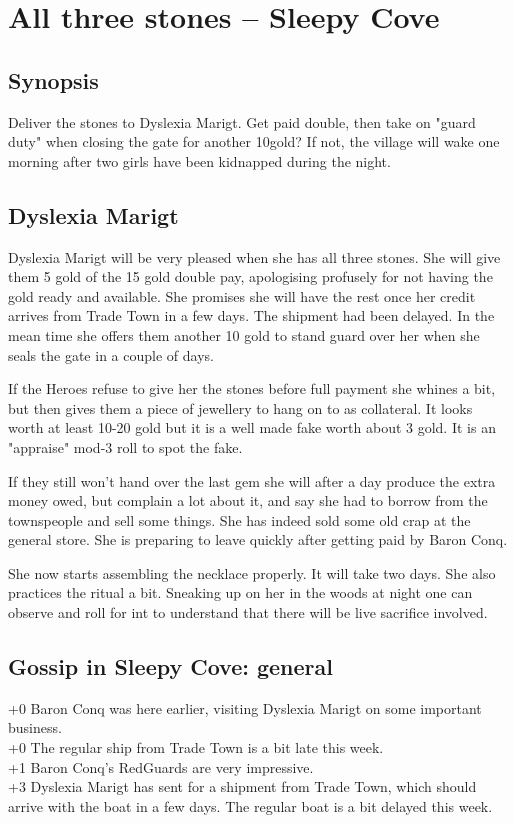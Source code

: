 \clearpage
{}
\section*{All three stones -- Sleepy Cove}


\subsection*{Synopsis}
Deliver the stones to Dyslexia Marigt. Get paid double, then take on "guard duty" when closing the gate for another 10gold? If not, the village will wake one morning after two girls have been kidnapped during the night.


\subsection*{Dyslexia Marigt}
Dyslexia Marigt will be very pleased when she has all three stones. She will give them 5 gold of the 15 gold double pay, apologising profusely for not having the gold ready and available. She promises she will have the rest once her credit arrives from Trade Town in a few days. The shipment had been delayed.
In the mean time she offers them another 10 gold to stand guard over her when she seals the gate in a couple of days.

If the Heroes refuse to give her the stones before full payment she whines a bit, but then gives them a piece of jewellery to hang on to as collateral. It looks worth at least 10-20 gold but it is a well made fake worth about 3 gold. It is an "appraise" mod-3 roll to spot the fake.

If they still won't hand over the last gem she will after a day produce the extra money owed, but complain a lot about it, and say she had to borrow from the townspeople and sell some things. She has indeed sold some old crap at the general store. She is preparing to leave quickly after getting paid by Baron Conq.

She now starts assembling the necklace properly. It will take two days. She also practices the ritual a bit. Sneaking up on her in the woods at night one can observe and roll for int to understand that there will be live sacrifice involved.


\subsection*{Gossip in Sleepy Cove: general}
+0 Baron Conq was here earlier, visiting Dyslexia Marigt on some important  business. \\
+0 The regular ship from Trade Town is a bit late this week. \\
+1 Baron Conq's RedGuards are very impressive. \\
+3 Dyslexia Marigt has sent for a shipment from Trade Town, which should arrive with the boat in a few days. The regular boat is a bit delayed this week. \\



